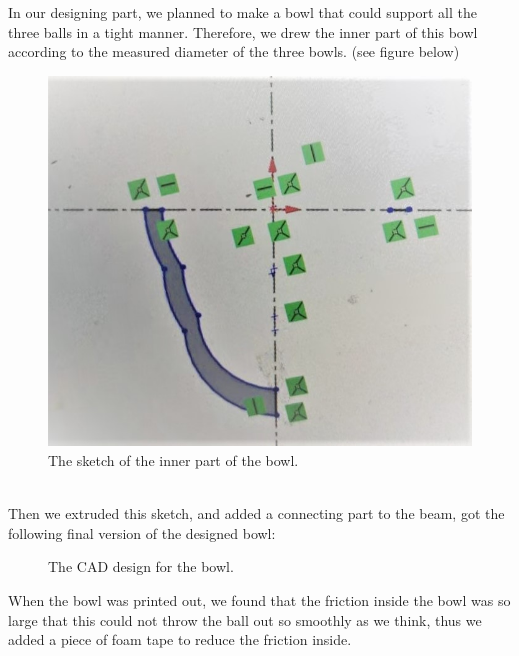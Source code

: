 \documentclass{article}
\begin{document}
In our designing part, we planned to make a bowl that could support all the three balls in a tight manner. Therefore, we drew the inner part of this bowl according to the measured diameter of the three bowls. (see figure below)\\
\begin{figure}[H]
\centering
\includegraphics[width=0.3\linewidth]{Bowlsketch}
\caption{The sketch of the inner part of the bowl.}
\end{figure}
~\\

Then we extruded this sketch, and added a connecting part to the beam, got the following final version of the designed bowl:\\

\begin{figure}[H] 
\centering 
{}
\caption{The CAD design for the bowl.}
\end{figure}

When the bowl was printed out, we found that the friction inside the bowl was so large that this could not throw the ball out so smoothly as we think, thus we added a piece of foam tape to reduce the friction inside.
\end{document}
